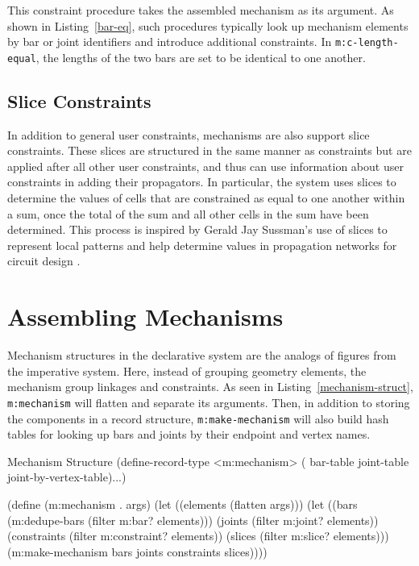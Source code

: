 This constraint procedure takes the assembled mechanism as its
argument. As shown in Listing~\ref{bar-eq}, such procedures
typically look up mechanism elements by bar or joint identifiers and
introduce additional constraints. In \texttt{m:c-length-equal}, the
lengths of the two bars are set to be identical to one another.

\subsection{Slice Constraints}

In addition to general user constraints, mechanisms are also support
slice constraints. These slices are structured in the same manner as
constraints but are applied after all other user constraints, and thus
can use information about user constraints in adding their
propagators. In particular, the system uses slices to determine the
values of cells that are constrained as equal to one another within a
sum, once the total of the sum and all other cells in the sum have
been determined. This process is inspired by Gerald Jay Sussman's use
of slices to represent local patterns and help determine values in
propagation networks for circuit design \cite{gjs-slices}.

\section{Assembling Mechanisms}
\enlargethispage*{\baselineskip}

Mechanism structures in the declarative system are the analogs of
figures from the imperative system.  Here, instead of grouping
geometry elements, the mechanism group linkages and constraints. As
seen in Listing~\ref{mechanism-struct}, \texttt{m:mechanism} will
flatten and separate its arguments. Then, in addition to storing the
components in a record structure, \texttt{m:make-mechanism} will also
build hash tables for looking up bars and joints by their endpoint and
vertex names.

\begin{code-listing}
[label=mechanism-struct]
{Mechanism Structure}
(define-record-type <m:mechanism>
    (%
                        bar-table joint-table joint-by-vertex-table)...)

(define (m:mechanism . args)
  (let ((elements (flatten args)))
    (let ((bars (m:dedupe-bars (filter m:bar? elements)))
          (joints (filter m:joint? elements))
          (constraints (filter m:constraint? elements))
          (slices (filter m:slice? elements)))
      (m:make-mechanism bars joints constraints slices))))
\end{code-listing}

